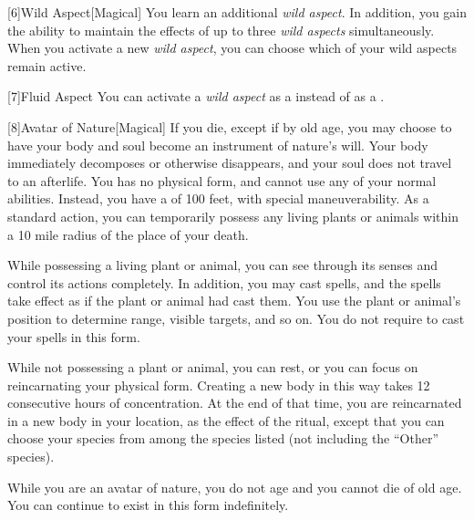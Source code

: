        [6]{Wild Aspect}[Magical]
        You learn an additional \textit{wild aspect}.
        In addition, you gain the ability to maintain the effects of up to three \textit{wild aspects} simultaneously.
        When you activate a new \textit{wild aspect}, you can choose which of your wild aspects remain active. 

        [7]{Fluid Aspect}
        You can activate a \textit{wild aspect} as a  instead of as a .

        [8]{Avatar of Nature}[Magical]
        If you die, except if by old age, you may choose to have your body and soul become an instrument of nature's will.
        Your body immediately decomposes or otherwise disappears, and your soul does not travel to an afterlife.
        You has no physical form, and cannot use any of your normal abilities.
        Instead, you have a  of 100 feet, with special maneuverability.
        As a standard action, you can temporarily possess any living plants or animals within a 10 mile radius of the place of your death.

        While possessing a living plant or animal, you can see through its senses and control its actions completely.
        In addition, you may cast spells, and the spells take effect as if the plant or animal had cast them.
        You use the plant or animal's position to determine range, visible targets, and so on.
        You do not require  to cast your spells in this form.

        While not possessing a plant or animal, you can rest, or you can focus on reincarnating your physical form.
        Creating a new body in this way takes 12 consecutive hours of concentration.
        At the end of that time, you are reincarnated in a new body in your location, as the effect of the  ritual, except that you can choose your species from among the species listed (not including the ``Other'' species).

        While you are an avatar of nature, you do not age and you cannot die of old age.
        You can continue to exist in this form indefinitely.

